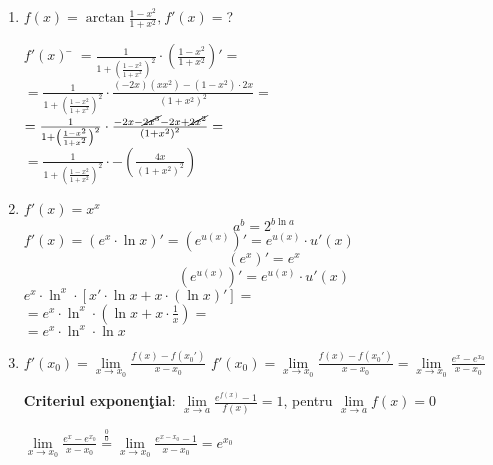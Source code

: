 \documentclass[a4paper, 12pt, notitlepage]{book}
\begin{document}
   \section{}
   \begin{enumerate}[\bfseries a.]
     \item $f(x) = \arctan \frac{1-x^{2}}{1+x^{2}}\text{,}\ f'(x) =$?
           \begin{tabbing}
             $f'(x)$ \= $= \frac{1}{1+ {\left(\frac{1-x^{2}}{1+x^{2}}\right)}^{2}} \cdot \left( \frac{1-x^{2}}{1+x^{2}} \right)' = $\\[2pt]
             \> $ = \frac{1}{1+ {\left(\frac{1-x^{2}}{1+x^{2}}\right)}^{2}} \cdot \frac{(-2x)(xx^{2}) - (1-x^{2})\cdot 2x}{{(1+x^{2})}^{2}} = $\\[2pt]
             \> $ = \frac{1}{1+ {\left(\frac{1-x^{2}}{1+x^{2}}\right)}^{2}} \cdot \frac{-2x - \cancel{2x^{3}} -2x + \cancel{2x^{2}} }{{(1+x^{2})}^{2}} = $\\[2pt]
             \> $ = \frac{1}{1+ {\left(\frac{1-x^{2}}{1+x^{2}}\right)}^{2}} \cdot -\left( \frac{4x}{{(1+x^{2})}^{2}} \right) $
           \end{tabbing}

     \item $f'(x) = x^{x}$
           \[ a^{b} = 2^{b \ln a}\]
           $f'(x) = (e^{x} \cdot \ln x)' = (e^{u(x)})' = e^{u(x)} \cdot u'(x)$
           \[ (e^{x})' = e^{x}\]
           \[ (e^{u(x)})' = e^{u(x)} \cdot u'(x) \]
           $e^{x} \cdot \ln^{x} \cdot [ x' \cdot \ln x + x \cdot (\ln x)' ] = $\\[2pt]
           $= e^{x} \cdot \ln^{x} \cdot (\ln x + x \cdot \frac{1}{x}) = $\\[2pt]
           $= e^{x} \cdot \ln^{x} \cdot \ln x$

     \item $f'(x_{0}) = \lim\limits_{x\to x_{0}} \frac{f(x)-f(x_{0}')}{x-x_{0}}$
           $f'(x_{0}) = \lim\limits_{x\to x_{0}} \frac{f(x)-f(x_{0}')}{x-x_{0}} = \lim\limits_{x\to x_{0}} \frac{e^{x}-e^{x_{0}}}{x-x_{0}}$
           \begin{center}
             \textbf{Criteriul exponen\c{t}ial}:
             $\lim\limits_{x \to a}\frac{e^{f(x)}-1}{f(x)} = 1$, pentru $\lim\limits_{x \to a}f(x)=0$
           \end{center}
           $\lim\limits_{x\to x_{0}} \frac{e^{x}-e^{x_{0}}}{x-x_{0}} \stackrel{\frac{0}{0}}{=} \lim\limits_{x\to x_{0}} \frac{e^{x-x_{0}}-1}{x-x_{0}} = e^{x_{0}}$
   \end{enumerate}
\end{document}
